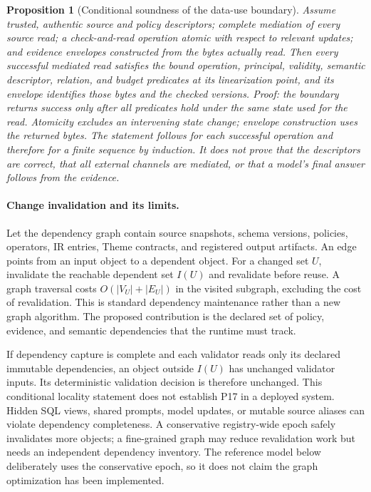 \documentclass[11pt]{article}
\newtheorem{proposition}{Proposition}
\begin{document}
\begin{proposition}[Conditional soundness of the data-use boundary]
Assume trusted, authentic source and policy descriptors; complete mediation of every source read; a check-and-read operation atomic with respect to relevant updates; and evidence envelopes constructed from the bytes actually read. Then every successful mediated read satisfies the bound operation, principal, validity, semantic descriptor, relation, and budget predicates at its linearization point, and its envelope identifies those bytes and the checked versions. Proof: the boundary returns success only after all predicates hold under the same state used for the read. Atomicity excludes an intervening state change; envelope construction uses the returned bytes. The statement follows for each successful operation and therefore for a finite sequence by induction. It does not prove that the descriptors are correct, that all external channels are mediated, or that a model's final answer follows from the evidence.
\end{proposition}

\paragraph{Change invalidation and its limits.}
Let the dependency graph contain source snapshots, schema versions, policies, operators, IR entries, Theme contracts, and registered output artifacts. An edge points from an input object to a dependent object. For a changed set $U$, invalidate the reachable dependent set $I(U)$ and revalidate before reuse. A graph traversal costs $O(|V_U|+|E_U|)$ in the visited subgraph, excluding the cost of revalidation. This is standard dependency maintenance rather than a new graph algorithm. The proposed contribution is the declared set of policy, evidence, and semantic dependencies that the runtime must track.

If dependency capture is complete and each validator reads only its declared immutable dependencies, an object outside $I(U)$ has unchanged validator inputs. Its deterministic validation decision is therefore unchanged. This conditional locality statement does not establish P17 in a deployed system. Hidden SQL views, shared prompts, model updates, or mutable source aliases can violate dependency completeness. A conservative registry-wide epoch safely invalidates more objects; a fine-grained graph may reduce revalidation work but needs an independent dependency inventory. The reference model below deliberately uses the conservative epoch, so it does not claim the graph optimization has been implemented.
\end{document}
